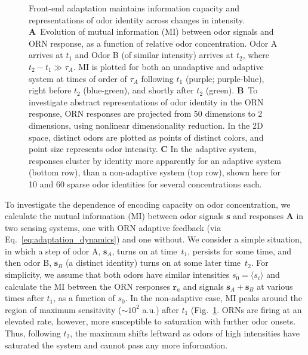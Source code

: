 \documentclass[9pt,twocolumn,twoside,lineno]{pnas-new}
\begin{document}
\begin{figure}[!tb]
\begin{subfigure}[t]{\linewidth}
		\label{fig:coding_a}
	\end{subfigure}
	\begin{subfigure}[t]{0\linewidth}
		\label{fig:coding_b}
	\end{subfigure}
	\caption{\footnotesize{Front-end adaptation maintains information capacity and representations of odor identity across changes in intensity. 
			\textbf{A}~Evolution of mutual information (MI) between odor signals and ORN response, as a function of relative odor concentration. Odor A arrives  at $t_1$ and Odor B (of similar intensity) arrives at $t_2$, where $t_2 - t_1 \gg \tau_A$. MI is plotted for both an unadaptive and adaptive system at times of order of $\tau_A$ following $t_1$ (purple; purple-blue), right before $t_2$ (blue-green), and shortly after $t_2$ (green). 
			\textbf{B}~To investigate abstract representations of odor identity in the ORN response, ORN responses are projected from 50 dimensions to 2 dimensions, using nonlinear dimensionality reduction. In the 2D space, distinct odors are plotted as points of distinct colors, and point size represents odor intensity. 
			\textbf{C} In the adaptive system, responses cluster by identity more apparently for an adaptive system (bottom row), than a non-adaptive system (top row), shown here for 10 and 60 sparse odor identities for several concentrations each.}} %
	\label{fig:coding}
\end{figure}

To investigate the dependence of encoding capacity on odor concentration, we calculate the mutual information (MI) between odor signals $\mathbf s$ and responses $\mathbf A$ in two sensing systems, one with ORN adaptive feedback (via Eq.~\ref{eq:adaptation_dynamics}) and one without. We consider a simple situation, in which a step of odor A, $\textbf{s}_A$,  turns on at time~$t_1$, persists for some time, and then odor B, $\mathbf s_B$ (a distinct identity) turns on at some later time~$t_2$. For simplicity, we assume that both odors have similar intensities $s_0 = \langle s_i \rangle$ and calculate the MI between the ORN responses $\mathbf {r}_a$ and signals $\mathbf s_A + \mathbf s_B$ at various times after $t_1$, as a function of $s_0$. In the non-adaptive case, MI peaks around the region of maximum sensitivity ($\sim 10^2$ a.u.) after $t_1$ (Fig.~\ref{fig:coding_a}. ORNs are firing at an elevated rate, however, more susceptible to saturation with further odor onsets. Thus, following $t_2$, the maximum shifts leftward as odors of high intensities have saturated the system and cannot pass any more information.
\end{document}
